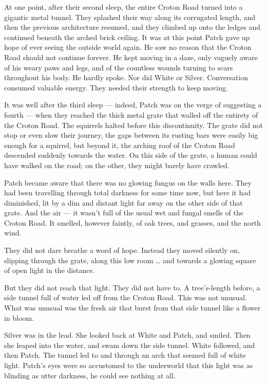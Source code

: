 \documentclass[ebook,oneside,openany,17pt]{memoir}
\begin{document}
At one point, after their second sleep, the entire Croton Road turned
into a gigantic metal tunnel. They splashed their way along its
corrugated length, and then the previous architecture resumed, and
they climbed up onto the ledges and continued beneath the arched brick
ceiling. It was at this point Patch gave up hope of ever seeing the
outside world again. He saw no reason that the Croton Road should not
continue forever. He kept moving in a daze, only vaguely aware of his
weary paws and legs, and of the countless wounds turning to scars
throughout his body. He hardly spoke. Nor did White or
Silver. Conversation consumed valuable energy. They needed their
strength to keep moving.

It was well after the third sleep — indeed, Patch was on the verge of
suggesting a fourth — when they reached the thick metal grate that
walled off the entirety of the Croton Road. The squirrels halted
before this discontinuity. The grate did not stop or even slow their
journey, the gaps between its rusting bars were easily big enough for
a squirrel, but beyond it, the arching roof of the Croton Road
descended suddenly towards the water. On this side of the grate, a
human could have walked on the road; on the other, they might barely
have crawled.

Patch became aware that there was no glowing fungus on the walls
here. They had been travelling through total darkness for some time
now, but here it had diminished, lit by a dim and distant light far
away on the other side of that grate. And the air — it wasn’t full of
the usual wet and fungal smells of the Croton Road. It smelled,
however faintly, of oak trees, and grasses, and the north wind.

They did not dare breathe a word of hope. Instead they moved silently
on, slipping through the grate, along this low room … and towards a
glowing square of open light in the distance.

But they did not reach that light. They did not have to. A
tree’s-length before, a side tunnel full of water led off from the
Croton Road. This was not unusual. What was unusual was the fresh air
that burst from that side tunnel like a flower in bloom.

Silver was in the lead. She looked back at White and Patch, and
smiled. Then she leaped into the water, and swam down the side
tunnel. White followed, and then Patch. The tunnel led to and through
an arch that seemed full of white light. Patch’s eyes were so
accustomed to the underworld that this light was as blinding as utter
darkness, he could see nothing at all.
\end{document}
